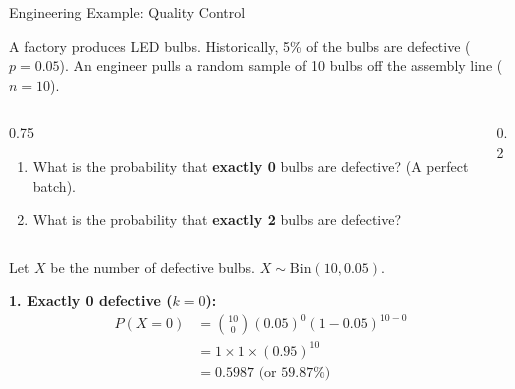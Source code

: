\begin{frame}[allowframebreaks]{Engineering Example: Quality Control}
    \begin{example}
        A factory produces LED bulbs. Historically, 5\% of the bulbs are defective ($p = 0.05$). An engineer pulls a random sample of 10 bulbs off the assembly line ($n = 10$).
        
        \vspace{0.2cm}
        \begin{columns}[T, onlytextwidth]
            \begin{column}{0.75\textwidth}
                \begin{enumerate}
                    \item What is the probability that \textbf{exactly 0} bulbs are defective? (A perfect batch).
                    \item What is the probability that \textbf{exactly 2} bulbs are defective?
                \end{enumerate}
            \end{column}
            
            \begin{column}{0.2\textwidth}
            \end{column}
        \end{columns}
    \end{example}

    \framebreak

    \begin{solution}
        Let $X$ be the number of defective bulbs. $X \sim \text{Bin}(10, 0.05)$.
        
        \vspace{0.2cm}
        \textbf{1. Exactly 0 defective ($k=0$):}
        \begin{align*}
            P(X=0) &= \binom{10}{0} (0.05)^0 (1 - 0.05)^{10-0} \\
                   &= 1 \times 1 \times (0.95)^{10} \\
                   &= \mathbf{0.5987} \text{ (or 59.87\%)}
        \end{align*}
    \end{solution}
    

\end{frame}
